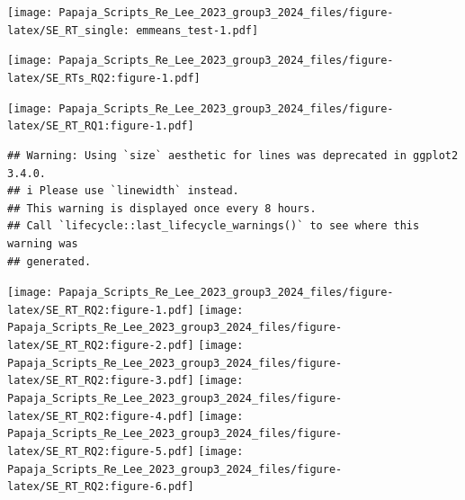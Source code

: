 \documentclass[
  man]{apa6}
\begin{document}
\texttt{[image: Papaja\_Scripts\_Re\_Lee\_2023\_group3\_2024\_files/figure-latex/SE\_RT\_single: emmeans\_test-1.pdf]}

\texttt{[image: Papaja\_Scripts\_Re\_Lee\_2023\_group3\_2024\_files/figure-latex/SE\_RTs\_RQ2:figure-1.pdf]}

\texttt{[image: Papaja\_Scripts\_Re\_Lee\_2023\_group3\_2024\_files/figure-latex/SE\_RT\_RQ1:figure-1.pdf]}

\begin{verbatim}
## Warning: Using `size` aesthetic for lines was deprecated in ggplot2 3.4.0.
## i Please use `linewidth` instead.
## This warning is displayed once every 8 hours.
## Call `lifecycle::last_lifecycle_warnings()` to see where this warning was
## generated.
\end{verbatim}

\texttt{[image: Papaja\_Scripts\_Re\_Lee\_2023\_group3\_2024\_files/figure-latex/SE\_RT\_RQ2:figure-1.pdf]} \texttt{[image: Papaja\_Scripts\_Re\_Lee\_2023\_group3\_2024\_files/figure-latex/SE\_RT\_RQ2:figure-2.pdf]} \texttt{[image: Papaja\_Scripts\_Re\_Lee\_2023\_group3\_2024\_files/figure-latex/SE\_RT\_RQ2:figure-3.pdf]} \texttt{[image: Papaja\_Scripts\_Re\_Lee\_2023\_group3\_2024\_files/figure-latex/SE\_RT\_RQ2:figure-4.pdf]} \texttt{[image: Papaja\_Scripts\_Re\_Lee\_2023\_group3\_2024\_files/figure-latex/SE\_RT\_RQ2:figure-5.pdf]} \texttt{[image: Papaja\_Scripts\_Re\_Lee\_2023\_group3\_2024\_files/figure-latex/SE\_RT\_RQ2:figure-6.pdf]}
\end{document}
